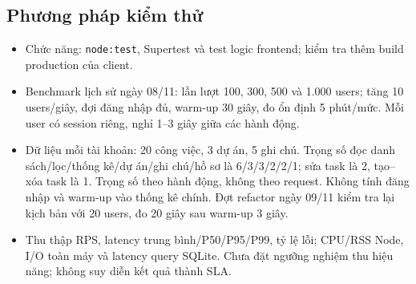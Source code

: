 \subsection{Phương pháp kiểm thử}
\begin{itemize}
  \item Chức năng: \texttt{node:test}, Supertest và test logic frontend;
  kiểm tra thêm build production của client.
  \item Benchmark lịch sử ngày 08/11: lần lượt 100, 300, 500 và 1.000 users;
  tăng 10 users/giây, đợi đăng nhập đủ, warm-up 30 giây, đo ổn định 5 phút/mức.
  Mỗi user có session riêng, nghỉ 1--3 giây giữa các hành động.
  \item Dữ liệu mỗi tài khoản: 20 công việc, 3 dự án, 5 ghi chú.
  Trọng số đọc danh sách/lọc/thống kê/dự án/ghi chú/hồ sơ là 6/3/3/2/2/1;
  sửa task là 2, tạo--xóa task là 1. Trọng số theo hành động, không theo request.
  Không tính đăng nhập và warm-up vào thống kê chính.
  Đợt refactor ngày 09/11 kiểm tra lại kịch bản với 20 users, đo 20 giây sau warm-up 3 giây.
  \item Thu thập RPS, latency trung bình/P50/P95/P99, tỷ lệ lỗi;
  CPU/RSS Node, I/O toàn máy và latency query SQLite.
  Chưa đặt ngưỡng nghiệm thu hiệu năng; không suy diễn kết quả thành SLA.
\end{itemize}
